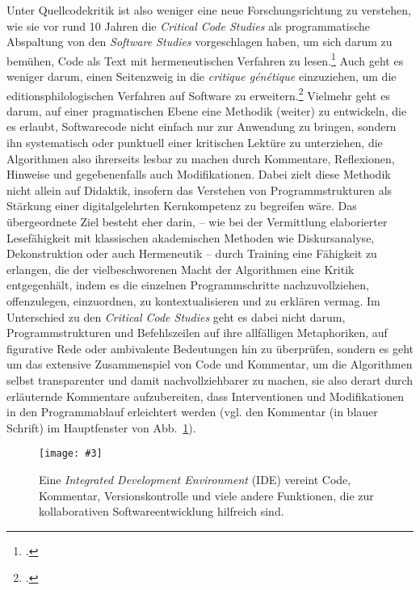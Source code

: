 \documentclass[a4paper,10pt]{article}
\newcommand{\pngbild}[4]{\texttt{[image: \#3]}}
\begin{document}
Unter Quellcodekritik ist also weniger eine neue Forschungsrichtung zu verstehen, wie sie vor rund 10 Jahren die \emph{Critical Code Studies}  als programmatische Abspaltung von den \emph{Software Studies} vorgeschlagen haben, um sich darum zu bemühen, Code als Text mit hermeneutischen Verfahren zu lesen.\footcite[Vgl.][]{marino:2006,marino:2010} Auch geht es weniger darum, einen Seitenzweig in die \emph{critique génétique} einzuziehen, um die editionsphilologischen Verfahren auf Software zu erweitern.\footcites[Zu letzterem siehe erste Ansätze bei][]{hiller:2014}[zur Editionsphilologie und \emph{critique génétique} allgemein][]{gresillon:1999} Vielmehr geht es darum, auf einer pragmatischen Ebene eine Methodik (weiter) zu entwickeln, die es erlaubt, Softwarecode nicht einfach nur zur Anwendung zu bringen, sondern ihn systematisch oder punktuell einer kritischen Lektüre zu unterziehen, die Algorithmen also ihrerseits lesbar zu machen durch Kommentare, Reflexionen, Hinweise und gegebenenfalls auch Modifikationen. Dabei zielt diese Methodik nicht allein auf Didaktik, insofern das Verstehen von Programmstrukturen als Stärkung einer digitalgelehrten Kernkompetenz zu begreifen wäre. Das übergeordnete Ziel besteht eher darin, – wie bei der Vermittlung elaborierter Lesefähigkeit mit klassischen akademischen Methoden wie Diskursanalyse, Dekonstruktion oder auch Hermeneutik – durch Training eine Fähigkeit zu erlangen, die der vielbeschworenen Macht der Algorithmen eine Kritik entgegenhält, indem es die einzelnen Programmschritte nachzuvollziehen, offenzulegen, einzuordnen, zu kontextualisieren und zu erklären vermag. Im Unterschied zu den  \emph{Critical Code Studies} geht es dabei nicht darum, Programmstrukturen und Befehlszeilen auf ihre allfälligen Metaphoriken, auf figurative Rede oder ambivalente Bedeutungen hin zu überprüfen, sondern es geht um das extensive Zusammenspiel von Code und Kommentar, um die Algorithmen selbst transparenter und damit nachvollziehbarer zu machen, sie also derart durch erläuternde Kommentare aufzubereiten, dass Interventionen und Modifikationen in den Programmablauf erleichtert werden (vgl. den Kommentar (in blauer Schrift) im Hauptfenster von Abb.~\ref{abb:ide}). 

\begin{figure}[ht]
\begin{center}
\pngbild{1440}{900}{../bilder/Abb-5.png}{1.16\textwidth}\\[-3mm]
\caption{Eine \emph{Integrated Development Environment} (IDE) vereint Code, Kommentar, Versionskontrolle und viele andere Funktionen, die zur kollaborativen Softwareentwicklung hilfreich sind.}\label{abb:ide}
\end{center}
\end{figure}
\end{document}
